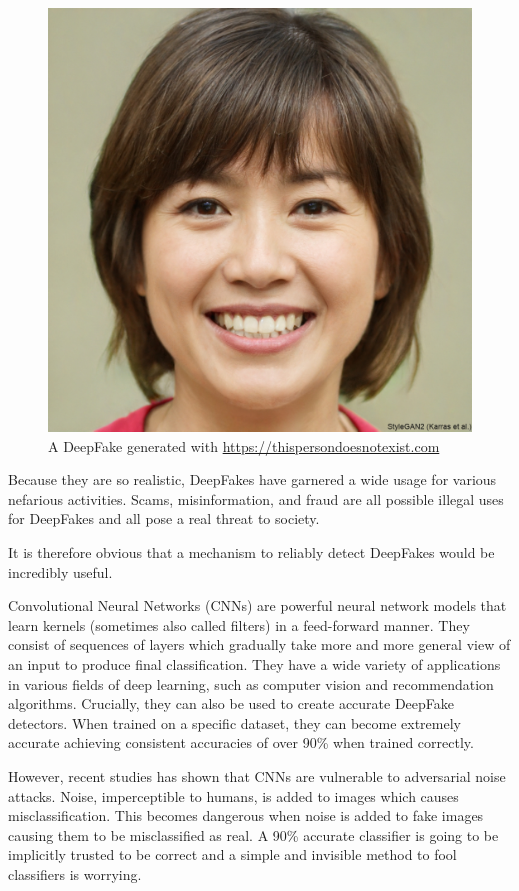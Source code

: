 \begin{figure}[H]
    \centering
    \includegraphics[width=0.5\linewidth]{dissertation//figures/thispersondoesnotexist.jpg}
    \caption{A DeepFake generated with \url{https://thispersondoesnotexist.com}}
    \label{fig:thispersondoesnotexist}
\end{figure}

Because they are so realistic, DeepFakes have garnered a wide usage for various nefarious activities. Scams, misinformation, and fraud are all possible illegal uses for DeepFakes and all pose a real threat to society\cite{sensity2024state}.

It is therefore obvious that a mechanism to reliably detect DeepFakes would be incredibly useful.

Convolutional Neural Networks (CNNs) are powerful neural network models that learn kernels (sometimes also called filters) in a feed-forward manner\cite{lecun2015deep}. They consist of sequences of layers which gradually take more and more general view of an input to produce final classification. They have a wide variety of applications in various fields of deep learning, such as computer vision and recommendation algorithms. Crucially, they can also be used to create accurate DeepFake detectors. When trained on a specific dataset, they can become extremely accurate achieving consistent accuracies of over 90\% when trained correctly\cite{papersiwthcodedeepfakedetection}.

However, recent studies has shown that CNNs are vulnerable to adversarial noise attacks. Noise, imperceptible to humans, is added to images which causes misclassification\cite{gandhi2020adversarial}. This becomes dangerous when noise is added to fake images causing them to be misclassified as real. A 90\% accurate classifier is going to be implicitly trusted to be correct and a simple and invisible method to fool classifiers is worrying.

